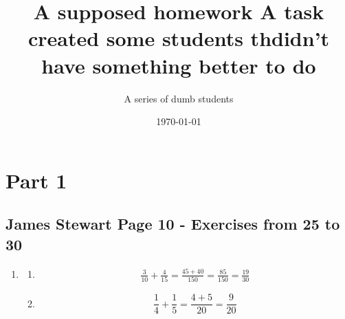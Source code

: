 \documentclass{article}
\title{
	A supposed homework 
	\large A task created some students thdidn't have something better to do
}
\author{A series of dumb students}
\date{\today}
\begin{document}
\maketitle

\section{Part 1}
\subsection{James Stewart Page 10  -  Exercises from 25 to 30}

\begin{enumerate}
	\item
	      \begin{enumerate}
		      \item
		            \begin{align*}
			            \frac{3}{10}  +  \frac{4}{15} = \frac{45 + 40}{150} 
			             = \frac{85}{150}  = \frac{19}{30}
		            \end{align*}
		      \item
		            \[ \frac{1}{4}  +  \frac{1}{5}  = \frac{4  +  5}{20}  = \frac{9}{20} \]
	      \end{enumerate}


\end{enumerate}
\end{document}
